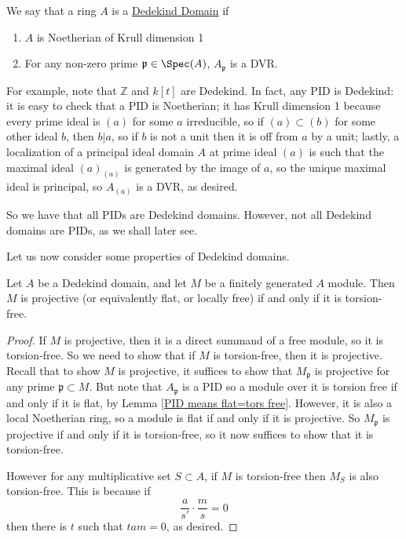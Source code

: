 \documentclass[12 pt]{article}
\theoremstyle{definition}
\newcommand\zz{\mathbb{Z}}
\newcommand\fp{{\mathfrak p}}
\begin{document}
\begin{definition} We say that a ring $A$ is a \uline{Dedekind Domain} if
\begin{enumerate}
\item $A$ is Noetherian of Krull dimension 1

\item For any non-zero prime $\fp \in \Spec(A)$, $A_\fp$ is a DVR.
\end{enumerate}
\end{definition}

For example, note that $\zz$ and $k[t]$ are Dedekind. In fact, any PID is Dedekind: it is easy to check that a PID is Noetherian; it has Krull dimension 1 because every prime ideal is $(a)$ for some $a$ irreducible, so if $(a) \subset(b)$ for some other ideal $b$, then $b|a$, so if $b$ is not a unit then it is off from $a$ by a unit; lastly, a localization of a principal ideal domain $A$ at prime ideal $(a)$ is such that the maximal ideal $(a)_{(a)}$ is generated by the image of $a$, so the unique maximal ideal is principal, so $A_{(a)}$ is a DVR, as desired.

So we have that all PIDs are Dedekind domains. However, not all Dedekind domains are PIDs, as we shall later see.


Let us now consider some properties of Dedekind domains.

\begin{proposition} Let $A$ be a Dedekind domain, and let $M$ be a finitely generated $A$ module. Then
$M$ is projective (or equivalently flat, or locally free) if and only if it is torsion-free.
\label{Dedekind means projective=tors free}
\end{proposition}
\begin{proof}
If $M$ is projective, then it is a direct summand of a free module, so it is torsion-free. So we need to show that if $M$ is torsion-free, then it is projective. Recall that to show $M$ is projective, it suffices to show that $M_\fp$ is projective for any prime $\fp \subset M$. But note that $A_\fp$ is a PID so a module over it is torsion free if and only if it is flat, by Lemma \ref{PID means flat=tors free}. However, it is also a local Noetherian ring, so a module is flat if and only if it is projective. So $M_\fp$ is projective if and only if it is torsion-free, so it now suffices to show that it is torsion-free.

However for any multiplicative set $S \subset A$, if $M$ is torsion-free then $M_S$ is also torsion-free. This is because if
\[\frac{a}{s'} \cdot \frac{m}{s}=0\]
then there is $t$ such that $tam=0$,
as desired.
\end{proof}
\end{document}
